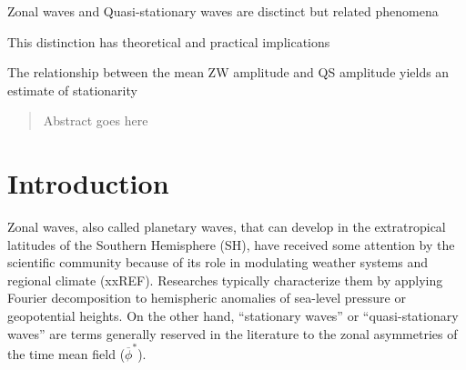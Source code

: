 \documentclass[draft,linenumbers]{agujournal2018}
\begin{document}



\begin{keypoints}
\item Zonal waves and Quasi-stationary waves are disctinct but related
phenomena
\item This distinction has theoretical and practical implications
\item The relationship between the mean ZW amplitude and QS amplitude yields
an estimate of stationarity
\end{keypoints}

%
%


\begin{abstract}
Abstract goes here
\end{abstract}

\section{Introduction}

Zonal waves, also called planetary waves, that can develop in the
extratropical latitudes of the Southern Hemisphere (SH), have received
some attention by the scientific community because of its role in
modulating weather systems and regional climate (xxREF). Researches
typically characterize them by applying Fourier decomposition to
hemispheric anomalies of sea-level pressure or geopotential heights. On
the other hand, ``stationary waves'' or ``quasi-stationary waves'' are
terms generally reserved in the literature to the zonal asymmetries of
the time mean field (\(\overline{\phi}^*\)).
\end{document}
